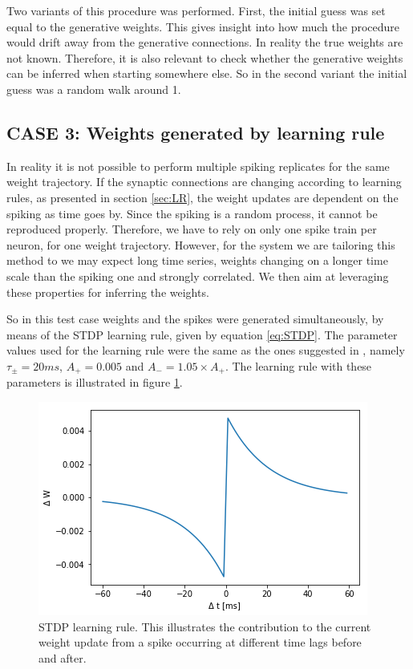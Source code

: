 Two variants of this procedure was performed. First, the initial guess was set equal to the generative weights. This gives insight into how much the procedure would drift away from the generative connections. In reality the true weights are not known. Therefore, it is also relevant to check whether the generative weights can be inferred when starting somewhere else. So in the second variant the initial guess was a random walk around 1. 

\subsection{CASE 3: Weights generated by learning rule}
\label{sec:case3_met}
In reality it is not possible to perform multiple spiking replicates for the same weight trajectory. If the synaptic connections are changing according to learning rules, as presented in section \ref{sec:LR}, the weight updates are dependent on the spiking as time goes by. Since the spiking is a random process, it cannot be reproduced properly. Therefore, we have to rely on only one spike train per neuron, for one weight trajectory. However, for the system we are tailoring this method to we may expect long time series, weights changing on a longer time scale than the spiking one and strongly correlated. We then aim at leveraging these properties for inferring the weights. 

So in this test case weights and the spikes were generated simultaneously, by means of the STDP learning rule, given by equation \ref{eq:STDP}. The parameter values used for the learning rule were the same as the ones suggested in \cite{Song}, namely $\tau_{\pm} = 20 ms$, $A_+ = 0.005$ and $A_- = 1.05 \times A_+$. The learning rule with these parameters is illustrated in figure \ref{fig:LR}.

\begin{figure}[hbt!]
\caption{STDP learning rule. This illustrates the contribution to the current weight update from a spike occurring at different time lags before and after.}
\label{fig:LR}
    \centering
    \includegraphics[scale=0.8]{fig/Learning_rule2.png}
\end{figure}

